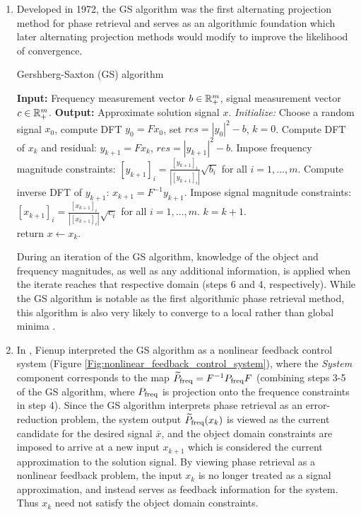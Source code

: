 \begin{enumerate}


\item

Developed in 1972, the GS algorithm was the first alternating projection method for phase retrieval and serves as an algorithmic foundation which later alternating projection methods would modify to improve the likelihood of convergence.  

\begin{algorithm}[H]
\caption{Gershberg-Saxton (GS) algorithm}	\label{Alg:GS}

\begin{algorithmic}[1]
	\Statex 	\textbf{Input:} Frequency measurement vector $b \in {\mathbb R}^m_+$, signal measurement vector $c \in {\mathbb R}^m_+$.
	\Statex 	\textbf{Output:} Approximate solution signal $x$.
	\State 		\textit{Initialize:} Choose a random signal $x_0$, compute DFT $y_0 = F x_0$, set $res=|y_0|^2 - b$, $k = 0$.
		\State 	Compute DFT of $x_k$ and residual: $y_{k+1} = F x_k$, $res = |y_{k+1}|^2 - b$.
		\State	Impose frequency magnitude constraints: $[y_{k+1}]_i = \frac{[y_{k+1}]_i}{|[y_{k+1}]_i|} \sqrt{b_i}$ for all $i = 1, \ldots, m$.
		\State	Compute inverse DFT of $y_{k+1}$: $x_{k+1} = F^{-1} y_{k+1}$.
		\State	Impose signal magnitude constraints: $[x_{k+1}]_i = \frac{[x_{k+1}]_i}{|[x_{k+1}]_i|} \sqrt{c_i}$ for all $i = 1, \ldots, m$.
		\State	$k = k + 1$.
	\EndWhile	\\
	return $x \leftarrow x_k$.
\end{algorithmic}
\end{algorithm}

During an iteration of the GS algorithm, knowledge of the object and frequency magnitudes, as well as any additional information, is applied when the iterate reaches that respective domain (steps 6 and 4, respectively).  While the GS algorithm is notable as the first algorithmic phase retrieval method, this algorithm is also very likely to converge to a local rather than global minima \cite{DBLP:journals/corr/JaganathanEH15a}.


\item

In \cite{Fienup82},  Fienup interpreted the GS algorithm as a nonlinear feedback control system (Figure \ref{Fig:nonlinear_feedback_control_system}), where the \textit{System} component corresponds to the map $\widetilde{P}_\textnormal{freq} = F^{-1} P_\textnormal{freq} F$ (combining steps 3-5 of the GS algorithm, where $P_\textnormal{freq}$ is projection onto the frequence constraints in step 4).  Since the GS algorithm interprets phase retrieval as an error-reduction problem, the system output $\widetilde{P}_\textnormal{freq}(x_k)$ is viewed as the current candidate for the desired signal $\bar{x}$, and the object domain constraints are imposed to arrive at a new input $x_{k+1}$ which is considered the current approximation to the solution signal.  By viewing phase retrieval as a nonlinear feedback problem, the input $x_k$ is no longer treated as a signal approximation, and instead serves as feedback information for the system.  Thus $x_k$ need not satisfy the object domain constraints.


\end{enumerate}
